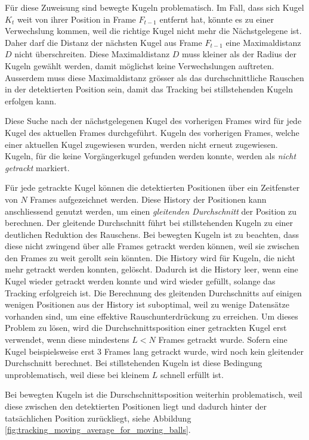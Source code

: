 Für diese Zuweisung sind bewegte Kugeln problematisch.
Im Fall, dass sich Kugel $K_{t}$ weit von ihrer Position in Frame $F_{t-1}$ entfernt hat,
könnte es zu einer Verwechslung kommen, weil die richtige Kugel nicht mehr die Nächstgelegene ist.
Daher darf die Distanz der nächsten Kugel aus Frame $F_{t-1}$ eine Maximaldistanz $D$ nicht überschreiten.
Diese Maximaldistanz $D$ muss kleiner als der Radius der Kugeln gewählt werden, damit möglichst keine Verwechslungen
auftreten. Ausserdem muss diese Maximaldistanz grösser als das durchschnittliche Rauschen in der detektierten Position
sein, damit das Tracking bei stillstehenden Kugeln erfolgen kann.

Diese Suche nach der nächstgelegenen Kugel des vorherigen Frames wird für jede Kugel des aktuellen Frames durchgeführt.
Kugeln des vorherigen Frames, welche einer aktuellen Kugel zugewiesen wurden, werden nicht erneut zugewiesen.
Kugeln, für die keine Vorgängerkugel gefunden werden konnte, werden als \emph{nicht getrackt} markiert.

Für jede getrackte Kugel können die detektierten Positionen über ein Zeitfenster von $N$ Frames aufgezeichnet werden.
Diese History der Positionen kann anschliessend genutzt werden, um einen \emph{gleitenden Durchschnitt}\cite{wiki:moving_average}
der Position zu berechnen.
Der gleitende Durchschnitt führt bei stillstehenden Kugeln zu einer deutlichen Reduktion des Rauschens.
Bei bewegten Kugeln ist zu beachten, dass diese nicht zwingend über alle Frames getrackt werden können,
weil sie zwischen den Frames zu weit gerollt sein könnten.
Die History wird für Kugeln, die nicht mehr getrackt werden konnten, gelöscht.
Dadurch ist die History leer, wenn eine Kugel wieder getrackt werden konnte und wird wieder gefüllt, solange das Tracking
erfolgreich ist.
Die Berechnung des gleitenden Durchschnitts auf einigen wenigen Positionen aus der History ist suboptimal, weil
zu wenige Datensätze vorhanden sind, um eine effektive Rauschunterdrückung zu erreichen.
Um dieses Problem zu lösen, wird die Durchschnittsposition einer getrackten Kugel erst verwendet,
wenn diese mindestens $L < N$ Frames getrackt wurde. Sofern eine Kugel beispielsweise erst 3 Frames lang getrackt wurde,
wird noch kein gleitender Durchschnitt berechnet.
Bei stillstehenden Kugeln ist diese Bedingung unproblematisch, weil diese bei kleinem $L$ schnell erfüllt ist.

Bei bewegten Kugeln ist die Durschschnittsposition weiterhin problematisch, weil diese zwischen den detektierten Positionen liegt und
dadurch hinter der tatsächlichen Position zurückliegt, siehe Abbildung \ref{fig:tracking_moving_average_for_moving_balls}.

